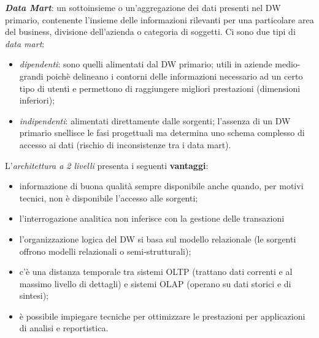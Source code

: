 \documentclass[a4paper, notitlepage, 9pt]{extreport}
\begin{document}
\textit{\textbf{Data Mart}}: un sottoinsieme o un’aggregazione dei dati presenti nel DW primario, contenente l’insieme delle informazioni rilevanti per una particolare area del business, divisione dell’azienda o categoria di soggetti. Ci sono due tipi di \textit{data mart}:
\begin{itemize}
	\item \textit{dipendenti}: sono quelli alimentati dal DW primario; utili in aziende medio-grandi poichè delineano i contorni delle informazioni necessario ad un certo tipo di utenti e permettono di raggiungere migliori prestazioni (dimensioni inferiori);
	\item \textit{indipendenti}: alimentati direttamente dalle sorgenti; l'assenza di un DW primario snellisce le fasi progettuali ma determina uno schema complesso di accesso ai dati (rischio di inconsistenze tra i data mart).
\end{itemize}
L'\textit{architettura a 2 livelli} presenta i seguenti \textbf{vantaggi}:
\begin{itemize}
	\item  informazione di buona qualità sempre disponibile anche quando, per motivi tecnici, non è disponibile l'accesso alle sorgenti;
	\item l'interrogazione analitica non inferisce con la gestione delle transazioni
	\item l'organizzazione logica del DW si basa sul modello relazionale (le sorgenti offrono modelli relazionali o semi-strutturali);
	\item c'è una distanza temporale tra sistemi OLTP (trattano dati correnti e al massimo livello di dettagli) e sistemi OLAP (operano su dati storici e di sintesi);
	\item è possibile impiegare tecniche per ottimizzare le prestazioni per applicazioni di analisi e reportistica.
\end{itemize}
\end{document}
